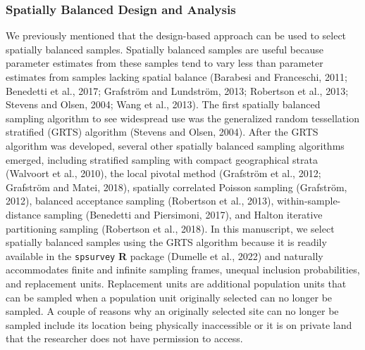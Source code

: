 \documentclass[]{elsarticle} %
\begin{document}
\hypertarget{subsec:spb_design}{%
\subsubsection{Spatially Balanced Design and
Analysis}\label{subsec:spb_design}}

We previously mentioned that the design-based approach can be used to
select spatially balanced samples. Spatially balanced samples are useful
because parameter estimates from these samples tend to vary less than
parameter estimates from samples lacking spatial balance (Barabesi and
Franceschi, 2011; Benedetti et al., 2017; Grafström and Lundström, 2013;
Robertson et al., 2013; Stevens and Olsen, 2004; Wang et al., 2013). The
first spatially balanced sampling algorithm to see widespread use was
the generalized random tessellation stratified (GRTS) algorithm (Stevens
and Olsen, 2004). After the GRTS algorithm was developed, several other
spatially balanced sampling algorithms emerged, including stratified
sampling with compact geographical strata (Walvoort et al., 2010), the
local pivotal method (Grafström et al., 2012; Grafström and Matei,
2018), spatially correlated Poisson sampling (Grafström, 2012), balanced
acceptance sampling (Robertson et al., 2013), within-sample-distance
sampling (Benedetti and Piersimoni, 2017), and Halton iterative
partitioning sampling (Robertson et al., 2018). In this manuscript, we
select spatially balanced samples using the GRTS algorithm because it is
readily available in the \texttt{spsurvey} \textbf{\textsf{R}} package
(Dumelle et al., 2022) and naturally accommodates finite and infinite
sampling frames, unequal inclusion probabilities, and replacement units.
Replacement units are additional population units that can be sampled
when a population unit originally selected can no longer be sampled. A
couple of reasons why an originally selected site can no longer be
sampled include its location being physically inaccessible or it is on
private land that the researcher does not have permission to access.
\end{document}
